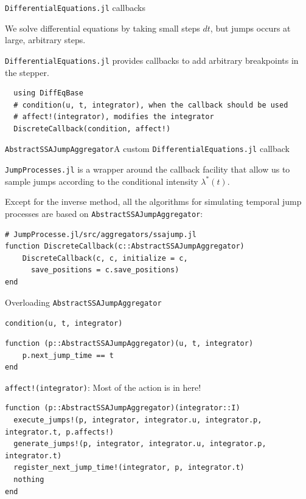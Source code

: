 \documentclass[
  ignorenonframetext,
  aspectratio=169,
  xcolor={dvipsnames,rgb}
]{beamer}
\begin{document}
\begin{frame}[fragile=singleslide]{\texttt{DifferentialEquations.jl} callbacks}

We solve differential equations by taking small steps \( dt \), but jumps occurs at large, arbitrary steps.

\texttt{DifferentialEquations.jl} provides callbacks to add arbitrary breakpoints in the stepper.

\begin{lstlisting}
  using DiffEqBase
  # condition(u, t, integrator), when the callback should be used
  # affect!(integrator), modifies the integrator
  DiscreteCallback(condition, affect!)
\end{lstlisting}

\end{frame}

\begin{frame}[fragile=singleslide]{\texttt{AbstractSSAJumpAggregator}}{A custom \texttt{DifferentialEquations.jl} callback}

\texttt{JumpProcesses.jl} is a wrapper around the callback facility that allow us to sample jumps according to the conditional intensity \( \lambda^\ast (t) \).

Except for the inverse method, all the algorithms for simulating temporal jump processes are based on \texttt{AbstractSSAJumpAggregator}:

\begin{lstlisting}
# JumpProcesse.jl/src/aggregators/ssajump.jl
function DiscreteCallback(c::AbstractSSAJumpAggregator)
    DiscreteCallback(c, c, initialize = c,
      save_positions = c.save_positions)
end
\end{lstlisting}

\end{frame}

\begin{frame}[fragile=singleslide]{Overloading \texttt{AbstractSSAJumpAggregator}}

\texttt{condition(u, t, integrator)}

\begin{lstlisting}
function (p::AbstractSSAJumpAggregator)(u, t, integrator)
    p.next_jump_time == t
end
\end{lstlisting}

\texttt{affect!(integrator)}: Most of the action is in here!

\begin{lstlisting}
function (p::AbstractSSAJumpAggregator)(integrator::I)
  execute_jumps!(p, integrator, integrator.u, integrator.p, integrator.t, p.affects!)
  generate_jumps!(p, integrator, integrator.u, integrator.p, integrator.t)
  register_next_jump_time!(integrator, p, integrator.t) 
  nothing
end
\end{lstlisting}

\end{frame}
\end{document}
